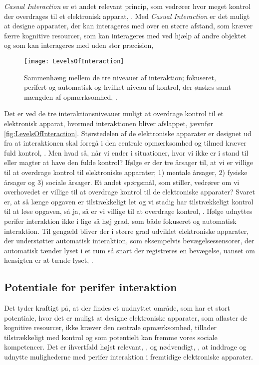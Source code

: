 \textit{Casual Interaction} er et andet relevant princip, som vedrører hvor meget kontrol der overdrages til et elektronisk apparat, \parencite[ss. 118-119]{PDF:PICasualInteractionKap6}. Med \textit{Casual Interaction} er det muligt at designe apparater, der kan interageres med over en større afstand, som kræver færre kognitive resourcer, som kan interageres med ved hjælp af andre objektet og som kan interageres med uden stor præcision, \parencite[s. 128]{PDF:PICasualInteractionKap6}        
%
\begin{figure}[H]
	\centering
	\texttt{[image: LevelsOfInteraction]}
	\caption{Sammenhæng mellem de tre niveauer af interaktion; fokuseret, perifert og automatisk og hvilket niveau af kontrol, der ønskes samt mængden af opmærksomhed, \parencite[s. 118]{PDF:PICasualInteractionKap6}.}
	\label{fig:LevelsOfInteraction}
\end{figure}
\noindent
%
Det er ved de tre interaktionsniveauer muligt at overdrage kontrol til et elektronisk apparat, hvormed interaktionen bliver afslappet, jævnfør \autoref{fig:LevelsOfInteraction}. Størstedelen af de elektroniske apparater er designet ud fra at interaktionen skal foregå i den centrale opmærksomhed og tilmed kræver fuld kontrol, \parencite[s. 118]{PDF:PICasualInteractionKap6}. Men hvad så, når vi ender i situationer, hvor vi ikke er i stand til eller magter at have den fulde kontrol? Ifølge \textcite[s. 123]{PDF:PICasualInteractionKap6} er der tre årsager til, at vi er villige til at overdrage kontrol til elektroniske apparater; 1) mentale årsager, 2) fysiske årsager og 3) sociale årsager. Et andet spørgsmål, som \textcite[s. 124]{PDF:PICasualInteractionKap6} stiller, vedrører om vi overhovedet er villige til at overdrage kontrol til de elektroniske apparater? Svaret er, at så længe opgaven er tilstrækkeligt let og vi stadig har tilstrækkeligt kontrol til at løse opgaven, så ja, så er vi villige til at overdrage kontrol, \parencite[s. 124]{PDF:PICasualInteractionKap6}.\blankline
%
Ifølge \textcite[s. 6]{PDF:PIIntroduction} udnyttes perifer interaktion ikke i lige så høj grad, som både fokuseret og automatisk interaktion. Til gengæld bliver der i større grad udviklet elektroniske apparater, der understøtter automatisk interaktion, som eksempelvis bevægelsessensorer, der automatisk tænder lyset i et rum så snart der registreres en bevægelse, uanset om hensigten er at tænde lyset, \parencite[s. 5]{PDF:PIIntroduction}.
% 
\subsection{Potentiale for perifer interaktion}
\label{Potentiale}
%
Det tyder kraftigt på, at der findes et uudnyttet område, som har et stort potentiale, hvor det er muligt at designe elektroniske apparater, som aflaster de kognitive resourcer, ikke kræver den centrale opmærksomhed, tillader tilstrækkeligt med kontrol og som potentielt kan fremme vores sociale kompetencer. Det er ihvertfald højst relevant, \parencite[s. 239]{PDF:PICharacteristicsAndConsiderations}, og nødvendigt, \parencite[s. 3]{PDF:TheComingAgeOfCalmTech}, at inddrage og udnytte mulighederne med perifer interaktion i fremtidige elektroniske apparater. 

